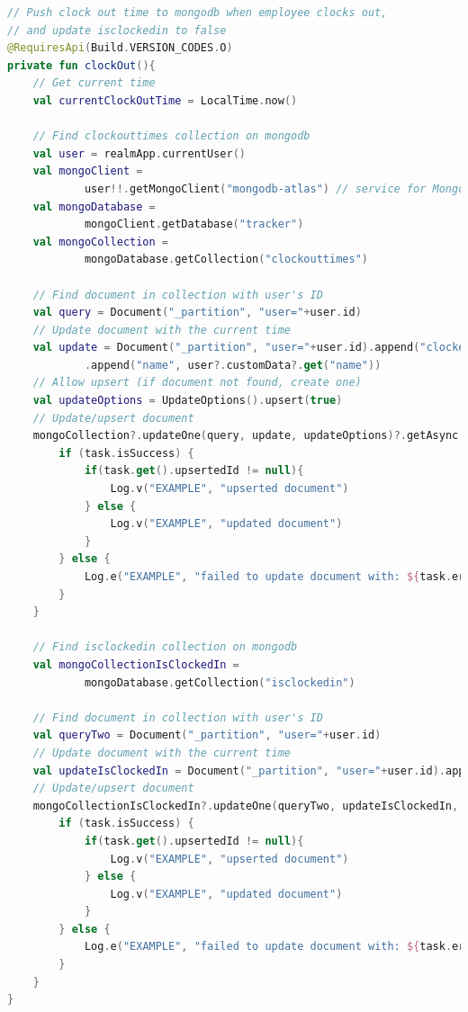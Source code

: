 \begin{lstlisting}[caption={Clock Out code}, label={lst:example1}, language=Kotlin]
// Push clock out time to mongodb when employee clocks out,
// and update isclockedin to false
@RequiresApi(Build.VERSION_CODES.O)
private fun clockOut(){
    // Get current time
    val currentClockOutTime = LocalTime.now()

    // Find clockouttimes collection on mongodb
    val user = realmApp.currentUser()
    val mongoClient =
            user!!.getMongoClient("mongodb-atlas") // service for MongoDB Atlas cluster containing custom user data
    val mongoDatabase =
            mongoClient.getDatabase("tracker")
    val mongoCollection =
            mongoDatabase.getCollection("clockouttimes")

    // Find document in collection with user's ID
    val query = Document("_partition", "user="+user.id)
    // Update document with the current time
    val update = Document("_partition", "user="+user.id).append("clockedOutTime", currentClockOutTime.format(DateTimeFormatter.ofLocalizedTime(FormatStyle.MEDIUM)))
            .append("name", user?.customData?.get("name"))
    // Allow upsert (if document not found, create one)
    val updateOptions = UpdateOptions().upsert(true)
    // Update/upsert document
    mongoCollection?.updateOne(query, update, updateOptions)?.getAsync { task ->
        if (task.isSuccess) {
            if(task.get().upsertedId != null){
                Log.v("EXAMPLE", "upserted document")
            } else {
                Log.v("EXAMPLE", "updated document")
            }
        } else {
            Log.e("EXAMPLE", "failed to update document with: ${task.error}")
        }
    }

    // Find isclockedin collection on mongodb
    val mongoCollectionIsClockedIn =
            mongoDatabase.getCollection("isclockedin")

    // Find document in collection with user's ID
    val queryTwo = Document("_partition", "user="+user.id)
    // Update document with the current time
    val updateIsClockedIn = Document("_partition", "user="+user.id).append("clockedIn", false)
    // Update/upsert document
    mongoCollectionIsClockedIn?.updateOne(queryTwo, updateIsClockedIn, updateOptions)?.getAsync { task ->
        if (task.isSuccess) {
            if(task.get().upsertedId != null){
                Log.v("EXAMPLE", "upserted document")
            } else {
                Log.v("EXAMPLE", "updated document")
            }
        } else {
            Log.e("EXAMPLE", "failed to update document with: ${task.error}")
        }
    }
}
\end{lstlisting}

